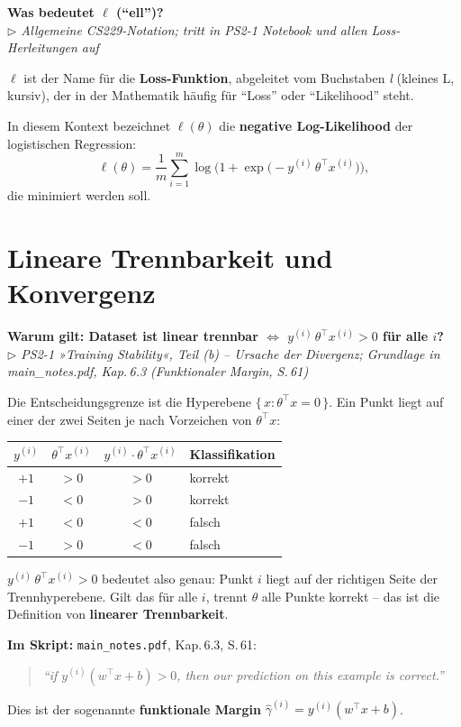 \documentclass[11pt, a4paper]{article}
\newenvironment{frage}[2]{%
  \begin{tcolorbox}[frageboxstyle, title={Frage}]
  \textbf{#1}\\[3pt]
  {\small\itshape\color{black!55}\(\triangleright\) #2}
  \end{tcolorbox}
  \begin{tcolorbox}[antwortboxstyle]
}{%
  \end{tcolorbox}
  \vspace{4mm}
}
\begin{document}
\begin{frage}{Was bedeutet \(\ell\) (``ell'')?}{Allgemeine CS229-Notation; tritt in PS2-1 Notebook und allen Loss-Herleitungen auf}

$\ell$ ist der Name für die \textbf{Loss-Funktion}, abgeleitet vom Buchstaben \textit{l} (kleines L,
kursiv), der in der Mathematik häufig für ``Loss'' oder ``Likelihood'' steht.

In diesem Kontext bezeichnet $\ell(\theta)$ die \textbf{negative Log-Likelihood} der logistischen
Regression:
\[
  \ell(\theta)
  = \frac{1}{m} \sum_{i=1}^{m}
    \log\!\bigl(1 + \exp\!\bigl(-y^{(i)}\,\theta^\top x^{(i)}\bigr)\bigr),
\]
die minimiert werden soll.

\end{frage}

\section{Lineare Trennbarkeit und Konvergenz}

\begin{frage}{Warum gilt: Dataset ist linear trennbar $\Leftrightarrow$ $y^{(i)}\,\theta^\top x^{(i)} > 0$ für alle $i$?}{PS2-1 »Training Stability«, Teil (b) -- Ursache der Divergenz; Grundlage in main\_notes.pdf, Kap.\,6.3 (Funktionaler Margin, S.\,61)}

Die Entscheidungsgrenze ist die Hyperebene $\{\,x : \theta^\top x = 0\,\}$. Ein Punkt liegt auf
einer der zwei Seiten je nach Vorzeichen von $\theta^\top x$:

\begin{center}
\begin{tabular}{cccl}
  \toprule
  $y^{(i)}$ & $\theta^\top x^{(i)}$ & $y^{(i)}\cdot\theta^\top x^{(i)}$ & Klassifikation \\
  \midrule
  $+1$ & $> 0$ & $> 0$ & korrekt \\
  $-1$ & $< 0$ & $> 0$ & korrekt \\
  $+1$ & $< 0$ & $< 0$ & falsch \\
  $-1$ & $> 0$ & $< 0$ & falsch \\
  \bottomrule
\end{tabular}
\end{center}

$y^{(i)}\,\theta^\top x^{(i)} > 0$ bedeutet also genau: Punkt $i$ liegt auf der richtigen Seite der
Trennhyperebene. Gilt das für alle $i$, trennt $\theta$ alle Punkte korrekt -- das ist die Definition
von \textbf{linearer Trennbarkeit}.

\textbf{Im Skript:} \texttt{main\_notes.pdf}, Kap.\,6.3, S.\,61:
\begin{quote}
\itshape
``if $y^{(i)}(w^\top x + b) > 0$, then our prediction on this example is correct.''
\end{quote}
Dies ist der sogenannte \textbf{funktionale Margin} $\hat{\gamma}^{(i)} = y^{(i)}(w^\top x + b)$.

\end{frage}
\end{document}
